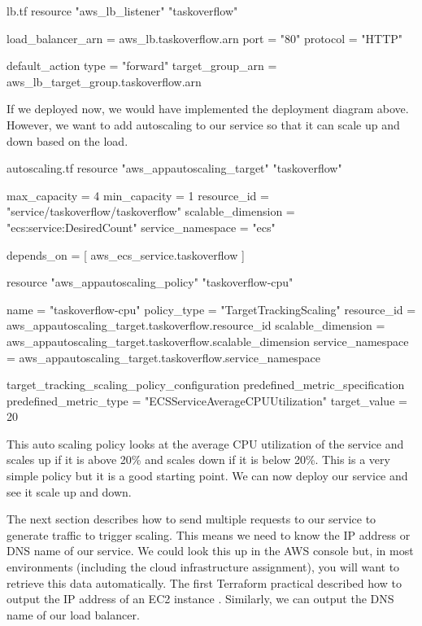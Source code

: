 \documentclass{csse4400}
\begin{document}
\begin{code}[language=terraform,numbers=none,keepspaces=true]{lb.tf}
resource "aws_lb_listener" "taskoverflow" {
  load_balancer_arn   = aws_lb.taskoverflow.arn
  port                = "80"
  protocol            = "HTTP"

  default_action {
    type              = "forward"
    target_group_arn  = aws_lb_target_group.taskoverflow.arn
  }
}
\end{code}

If we deployed now, we would have implemented the deployment diagram above.
However, we want to add autoscaling to our service so that it can scale up and down based on the load.

\begin{code}[language=terraform,numbers=none,keepspaces=true]{autoscaling.tf}
resource "aws_appautoscaling_target" "taskoverflow" {
  max_capacity        = 4
  min_capacity        = 1
  resource_id         = "service/taskoverflow/taskoverflow"
  scalable_dimension  = "ecs:service:DesiredCount"
  service_namespace   = "ecs"
  
  depends_on = [ aws_ecs_service.taskoverflow ]
}

resource "aws_appautoscaling_policy" "taskoverflow-cpu" {
  name                = "taskoverflow-cpu"
  policy_type         = "TargetTrackingScaling"
  resource_id         = aws_appautoscaling_target.taskoverflow.resource_id
  scalable_dimension  = aws_appautoscaling_target.taskoverflow.scalable_dimension
  service_namespace   = aws_appautoscaling_target.taskoverflow.service_namespace

  target_tracking_scaling_policy_configuration {
    predefined_metric_specification {
      predefined_metric_type  = "ECSServiceAverageCPUUtilization"
    }
    target_value              = 20
  }
}
\end{code}

This auto scaling policy looks at the average CPU utilization of the service and scales up if it is above 20\% and scales down if it is below 20\%.
This is a very simple policy but it is a good starting point.
We can now deploy our service and see it scale up and down.


The next section describes how to send multiple requests to our service to generate traffic to trigger scaling.
This means we need to know the IP address or DNS name of our service.
We could look this up in the AWS console but,
in most environments (including the cloud infrastructure assignment),
you will want to retrieve this data automatically.
The first Terraform practical described how to output the IP address of an EC2 instance \cite{prac-week4}.
Similarly, we can output the DNS name of our load balancer.
\end{document}

